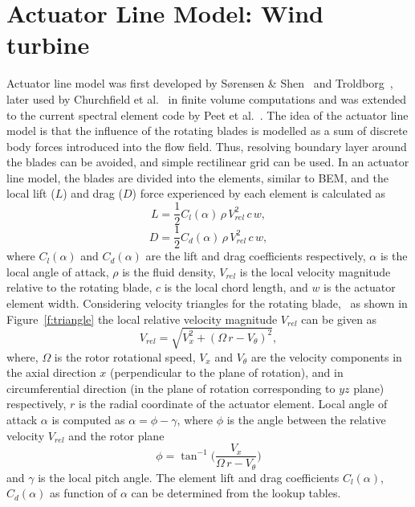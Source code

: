 \section{Actuator Line Model: Wind turbine}
Actuator line model was first developed by S{\o}rensen \& Shen~\cite{sorensen:02} and Troldborg~\cite{troldborg}, later used by Churchfield et al.~\cite{churchfield,churchfield_2} in finite volume computations and was extended to the current spectral element code by Peet et al.~\cite{peet2}. The idea of the actuator line model is that the influence of the rotating blades is modelled as a sum of discrete body forces introduced into the flow field. Thus, resolving boundary layer around the blades can be avoided, and simple rectilinear grid can be used.  In an actuator line model, the blades are divided into the elements, similar to BEM, and the local lift ($L$) and drag ($D$) force experienced by each element is calculated as
\begin{equation}
L=\frac{1}{2}C_l(\alpha)\,\rho\,V_{rel}^2\,c\,w,
\end{equation}
\begin{equation}
D=\frac{1}{2}C_d(\alpha)\,\rho\,V_{rel}^2\,c\,w,
\end{equation}
where $C_l(\alpha)$ and $C_d(\alpha)$ are the lift and drag coefficients respectively, $\alpha$ is the local angle of attack, $\rho$ is the fluid density, $V_{rel}$ is the local velocity magnitude relative to the rotating blade, $c$ is the local chord length, and $w$ is the actuator element width. Considering velocity triangles for the rotating blade,~\cite{sorensen:02, troldborg} as shown in Figure~\ref{f:triangle} the local relative velocity magnitude $V_{rel}$ can be given as
\begin{equation}
V_{rel}=\sqrt{V^2_x+(\Omega\,r-V_{\theta})^2},
\end{equation}
where, $\Omega$ is the rotor rotational speed, $V_x$ and $V_{\theta}$ are the velocity components in the axial direction $x$ (perpendicular to the plane of rotation), and in circumferential direction (in the plane of rotation corresponding to $y z$ plane) respectively, $r$ is the radial coordinate of the actuator element. Local angle of attack $\alpha$ is computed as $\alpha=\phi-\gamma$, where $\phi$ is the angle between the relative velocity $V_{rel}$ and the rotor plane
\begin{equation}
\phi=\tan^{-1}\big(\frac{V_x}{\Omega\,r-V_\theta} \big)
\end{equation}
and $\gamma$ is the local pitch angle. The element lift and drag coefficients $C_l(\alpha)$, $C_d(\alpha)$ as function of $\alpha$ can be determined from the lookup tables.
